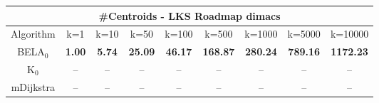 \begin{tabular}{c|cccccccc}\toprule
\multicolumn{9}{c}{#Centroids - LKS Roadmap dimacs}\\ \midrule
Algorithm & k=1 & k=10 & k=50 & k=100 & k=500 & k=1000 & k=5000 & k=10000 \\ \midrule
BELA$_0$ & \textbf{1.00} & \textbf{5.74} & \textbf{25.09} & \textbf{46.17} & \textbf{168.87} & \textbf{280.24} & \textbf{789.16} & \textbf{1172.23} \\
K$_0$ & -- & -- & -- & -- & -- & -- & -- & -- \\
mDijkstra & -- & -- & -- & -- & -- & -- & -- & -- \\ \bottomrule 
\end{tabular}
